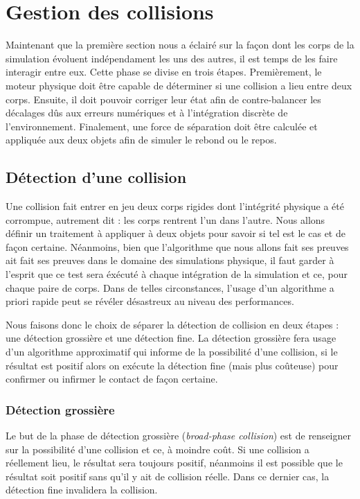 \section{Gestion des collisions}

Maintenant que la première section nous a éclairé sur la façon dont
les corps de la simulation évoluent indépendament les uns des autres,
il est temps de les faire interagir entre eux. Cette phase se divise
en trois étapes. Premièrement, le moteur physique doit être capable de
déterminer si une collision a lieu entre deux corps. Ensuite, il doit
pouvoir corriger leur état afin de contre-balancer les décalages dûs
aux erreurs numériques et à l'intégration discrète de
l'environnement. Finalement, une force de séparation doit être
calculée et appliquée aux deux objets afin de simuler le rebond ou le
repos.

\subsection{Détection d'une collision}

Une collision fait entrer en jeu deux corps rigides dont l'intégrité
physique a été corrompue, autrement dit : les corps rentrent l'un dans
l'autre. Nous allons définir un traitement à appliquer à deux objets
pour savoir si tel est le cas et de façon certaine. Néanmoins, bien
que l'algorithme que nous allons fait ses preuves ait fait ses preuves
dans le domaine des simulations physique, il faut garder à l'esprit
que ce test sera éxécuté à chaque intégration de la simulation et ce,
pour chaque paire de corps. Dans de telles circonstances, l'usage d'un
algorithme a priori rapide peut se révéler désastreux au niveau des
performances.

Nous faisons donc le choix de séparer la détection de collision en
deux étapes : une détection grossière et une détection fine. La
détection grossière fera usage d'un algorithme approximatif qui
informe de la possibilité d'une collision, si le résultat est positif
alors on exécute la détection fine (mais plus coûteuse) pour confirmer
ou infirmer le contact de façon certaine.

\subsubsection{Détection grossière}

Le but de la phase de détection grossière (\textit{broad-phase
  collision}) est de renseigner sur la possibilité d'une collision et
ce, à moindre coût. Si une collision a réellement lieu, le résultat
sera toujours positif, néanmoins il est possible que le résultat soit
positif sans qu'il y ait de collision réelle. Dans ce dernier cas, la
détection fine invalidera la collision.


